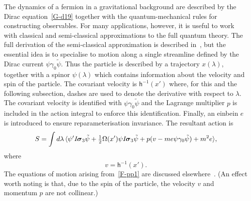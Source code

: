 \documentclass[a4paper]{article}
\numberwithin{equation}{section}
\newcommand{\la}{\langle}
\newcommand{\ra}{\rangle}
\newcommand{\half}{{\textstyle \frac{1}{2}}}
\newcommand{\eqv}{=}
\newcommand{\lam}{\lambda}
\newcommand{\sig}{\mbox{\boldmath $\sigma$}}
\newcommand{\Om}{\Omega}
\newcommand{\bsig}{\mbox{\boldmath $\sig$}}
\newcommand{\isk}{I \hspace{-1pt} \bsig_3}
\newcommand{\go}{\gamma_{0}}
\newcommand{\psirev}{\tilde{\psi}}
\newcommand{\lih}{\mathsf{h}}
\newcommand{\hu}{\lih}
\begin{document}
The dynamics of a fermion in a gravitational background are described
by the Dirac equation~\eqref{G-d19} together with the
quantum-mechanical rules for constructing observables.  For many
applications, however, it is useful to work with classical and
semi-classical approximations to the full quantum theory.  The full
derivation of the semi-classical approximation is described
in~\cite{gap}, but the essential idea is to specialise to motion along
a single streamline defined by the Dirac current $\psi\go\psirev$.
Thus the particle is described by a trajectory $x(\lam)$, together
with a spinor $\psi(\lam)$ which contains information about the
velocity and spin of the particle.  The covariant velocity is
$\hu^{-1}(x')$ where, for this and the following subsection, dashes
are used to denote the derivative with respect to $\lam$.  The
covariant velocity is identified with $\psi\go\psirev$ and the
Lagrange multiplier $p$ is included in the action integral to enforce
this identification.  Finally, an einbein $e$ is introduced to ensure
reparameterisation invariance.  The resultant action is
%
\begin{equation}
S = \int d\lam \, \la \psi' \isk\psirev + \half \Om(x')
\psi\isk\psirev + p(v - m e \psi\go\psirev) +m^2 e \ra,
\label{F-pp1}
\end{equation}
%
where
%
\begin{equation}
v \eqv \hu^{-1}(x').
\end{equation}
%
The equations of motion arising from~\eqref{F-pp1} are discussed
elsewhere~\cite{gap}.  (An effect worth noting is that, due to the
spin of the particle, the velocity $v$ and momentum $p$ are not
collinear.)
\end{document}
